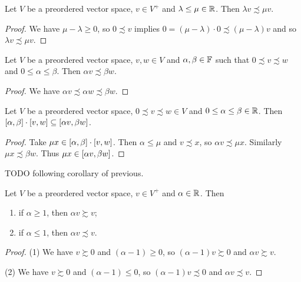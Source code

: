 \begin{lemma} \label{scalarInequalityImpliesVectorInequality}
Let $V$ be a preordered vector space, $v\in V^+$ and $\lambda \leq \mu\in \mathbb{R}$. Then $\lambda v \precsim \mu v$.
\end{lemma}
\begin{proof}
We have $\mu-\lambda \geq 0$, so $0\precsim v$ implies $0 = (\mu-\lambda)\cdot 0 \precsim (\mu-\lambda)v$ and so $\lambda v \precsim \mu v$.
\end{proof}
\begin{corollary} \label{scalarVectorInequalityMultiplication}
Let $V$ be a preordered vector space, $v,w\in V$ and $\alpha, \beta\in \mathbb{F}$ such that $0\precsim v\precsim w$ and $0\leq \alpha \leq \beta$. Then $\alpha v \precsim \beta w$.
\end{corollary}
\begin{proof}
We have $\alpha v \precsim \alpha w \precsim \beta w$.
\end{proof}
\begin{corollary} \label{intervalScalarMultiplicationInclusion}
Let $V$ be a preordered vector space, $0\precsim v \precsim w\in V$ and $0\leq \alpha \leq \beta \in \mathbb{R}$. Then $\interval{\alpha, \beta} \cdot \interval{v, w} \subseteq \interval{\alpha v, \beta w}$.
\end{corollary}
\begin{proof}
Take $\mu x\in \interval{\alpha, \beta} \cdot \interval{v, w}$. Then $\alpha \leq \mu$ and $v \precsim x$, so $\alpha v \precsim \mu x$. Similarly $\mu x \precsim \beta w$. Thus $\mu x \in \interval{\alpha v, \beta w}$.
\end{proof}

TODO following corollary of previous.
\begin{lemma} \label{scalarMultiplicationInequalities}
Let $V$ be a preordered vector space, $v\in V^+$ and $\alpha\in \mathbb{R}$. Then
\begin{enumerate}
\item if $\alpha \geq 1$, then $\alpha v \succsim v$;
\item if $\alpha \leq 1$, then $\alpha v \precsim v$.
\end{enumerate}
\end{lemma}
\begin{proof}
(1) We have $v\succsim 0$ and $(\alpha-1) \geq 0$, so $(\alpha-1)v \succsim 0$ and $\alpha v \succsim v$.

(2) We have $v\succsim 0$ and $(\alpha-1) \leq 0$, so $(\alpha-1)v \precsim 0$ and $\alpha v \precsim v$.
\end{proof}

